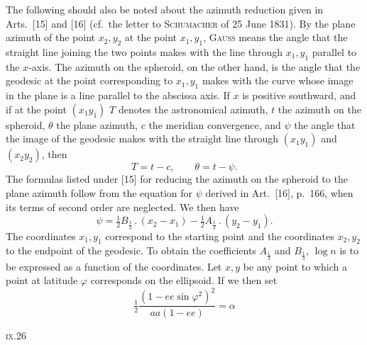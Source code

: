 {The following should also be noted about the azimuth reduction given in Arts.\ [15]
and [16] (cf.\ the letter to \textsc{Schumacher} of 25 June 1831).
By the plane azimuth of the point \(x_2,y_2\) at the point \(x_1,y_1\), \textsc{Gauss}
means the angle that the straight line joining the two points makes with the line
through \(x_1,y_1\) parallel to the \(x\)-axis. The azimuth on the spheroid, on the other
hand, is the angle that the geodesic at the point corresponding to \(x_1,y_1\) makes with
the curve whose image in the plane is a line parallel to the abscissa axis.
If \(x\) is positive southward, and if at the point \((x_1y_1)\)
\(T\) denotes the astronomical azimuth, \(t\) the azimuth on the spheroid, \(\theta\) the
plane azimuth, \(c\) the meridian convergence, and \(\psi\) the angle that the image
of the geodesic makes with the straight line through \((x_1y_1)\) and \((x_2y_2)\), then
\[
T=t-c,\qquad \theta=t-\psi.
\]
The formulas listed under [15] for reducing the azimuth on the spheroid to the
plane azimuth follow from the equation for \(\psi\) derived in Art.\ [16], p.\ 166,
when its terms of second order are neglected. We then have
\[
\psi=\tfrac12 B_{\frac13}\,.\,(x_2-x_1)-\tfrac12 A_{\frac13}\,.\,(y_2-y_1).
\]
The coordinates \(x_1,y_1\) correspond to the starting point and the coordinates \(x_2,y_2\)
to the endpoint of the geodesic. To obtain the coefficients \(A_{\frac13}\) and
\(B_{\frac13}\), \(\log n\) is to be expressed as a function of the coordinates.
Let \(x,y\) be any point to which a point at latitude \(\varphi\) corresponds
on the ellipsoid. If we then set
\begin{equation*}
\tfrac12\frac{(1-ee\sin\varphi^2)^2}{aa(1-ee)}=\alpha
\tag*{1)}
\end{equation*}
\par}
\noindent\textsc{ix.}\hfill 26\hspace*{.12\linewidth}\par
\endgroup

